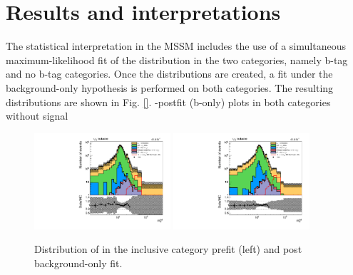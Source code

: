 \section{Results and interpretations}
\label{sec:analysis_results}

The statistical interpretation in the MSSM includes the use of a simultaneous maximum-likelihood fit of the \mttot distribution in the two categories, namely b-tag and no b-tag categories.  Once the \mttot distributions are created, a fit under the background-only hypothesis is performed on both categories. The resulting distributions are shown in Fig. \ref{}.
-postfit (b-only) plots in both categories without signal

\begin{figure}
    \centering
    \includegraphics[width=0.45\textwidth]{Images/prefit_plots_tt_inclusive.pdf}
    \includegraphics[width=0.45\textwidth]{Images/postfit_b_plots_tt_inclusive.pdf}
    \caption{Distribution of \mttot in the inclusive category prefit (left) and post background-only fit.}
    \label{fig:control_plots}
\end{figure}

